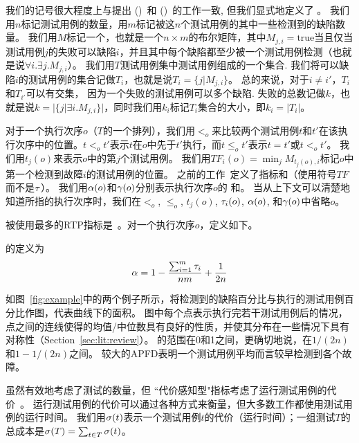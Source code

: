 我们的记号很大程度上与提出\APFDFull{} (\APFD{})~\cite{rothermel2001prioritizing}和\APFDcFull{} (\APFDc{})~\cite{elbaum2001incorporating}的工作一致, 但我们显式地定义了 \mappingMatrix{}。
我们用$n$标记测试用例的数量，用$m$标记被这$n$个测试用例的其中一些检测到的缺陷数量。
我们用$M$标记一个\mappingMatrix{}，也就是一个$n\times m$的布尔矩阵，其中$M_{j,i}=\textrm{true}$当且仅当测试用例$j$的失败可以\detects 缺陷$i$，并且其中每个缺陷都至少被一个测试用例检测（也就是说$\forall i.\exists j. M_{j,i}$）。
我们用$T$测试用例集中测试用例组成的一个集合.
我们将可以\detect{}缺陷$i$的测试用例的集合记做$T_i$，也就是说$T_i=\{j|M_{j,i}\}$。
总的来说，对于$i\ne i'$，$T_i$和$T_{i'}$可以有交集， 因为一个失败的测试用例可以\detect{}多个缺陷.
失败的总数记做$k$，也就是说$k=|\{j|\exists i. M_{j,i}\}|$，同时我们用$k_i$标记$T_i$集合的大小，即$k_i=|T_i|$。

对于一个执行次序$o$（$T$的一个排列），我们用$<_o$来比较两个测试用例$t$和$t'$在该执行次序中的位置。$t<_o t'$表示$t$在$o$中先于$t'$执行，而$t\le_o t'$表示$t=t'$或$t<_o t'$。
我们用$t_{j}(o)$来表示$o$中的第$j$个测试用例。
我们用$TF_{i}(o)=\min_j M_{t_{j}(o),i}$标记$o$中第一个检测到故障$i$的测试用例的位置。
之前的工作~\cite{elbaum2001incorporating,rothermel2001prioritizing}定义了指标\APFD{}和\APFDc{}（使用符号$TF$而不是$\tau$）。
我们用$\mathrm{\alpha}{}(o)$和$\mathrm{\gamma}{}(o)$分别表示执行次序$o$的 \APFD{}和\APFDc。
当从上下文可以清楚地知道所指的执行次序时，我们在$<_o$, $\le_o$, $t_{j}(o)$, $\tau_{i}(o)$, $\mathrm{\alpha}{}(o)$, 和$\mathrm{\gamma}{}(o)$中省略$o$。

被使用最多的RTP指标是\APFD{}~\cite{rothermel2001prioritizing}。对一个执行次序$o$，\APFD{}定义如下。

\begin{mydefinition}[\APFD]
\APFDFull{}的定义为
\begin{equation}\label{definition_apfd}
    \mathrm{\alpha}=1-\frac{\sum_{i=1}^m\tau_i}{nm}+\frac{1}{2n}
\end{equation}
\end{mydefinition}

如图~\ref{fig:example}中的两个例子所示，将检测到的缺陷百分比与执行的测试用例百分比作图，\APFD{}代表曲线下的面积。
图中每个点表示执行完若干测试用例后的情况，点之间的连线使得\APFD{}的均值/中位数具有良好的性质，并使其分布在一些情况下具有对称性（Section~\ref{sec:lit:review}）。
\APFD{}的范围在0和1之间，更确切地说，在$1/(2n)$和$1-1/(2n)$之间。
较大的APFD{}表明一个测试用例平均而言较早检测到各个故障。

虽然\APFD{}有效地考虑了测试的数量，但 “代价感知型"指标\APFDc{}考虑了运行测试用例的代价~\cite{elbaum2001incorporating}。
运行测试用例的代价可以通过各种方式来衡量，但大多数工作都使用测试用例的运行时间。
我们用$\sigma(t)$表示一个测试用例$t$的代价（运行时间）；一组测试$T$的总成本是$\sigma(T)=\sum_{t\in T}\sigma(t)$。

